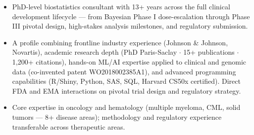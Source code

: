 \vspace*{.2em}
\begin{itemize}
\item[-] PhD-level biostatistics consultant with 13+ years across the full clinical development lifecycle --- from Bayesian Phase I dose-escalation through Phase III pivotal design, high-stakes analysis milestones, and regulatory submission.
\item[-] A profile combining frontline industry experience (Johnson \& Johnson, Novartis), academic research depth (PhD Paris-Saclay $\cdot$ 15+ publications $\cdot$ 1,200+ citations), hands-on ML/AI expertise applied to clinical and genomic data (co-invented patent WO2018002385A1), and advanced programming capabilities (R/Shiny, Python, SAS, SQL, Harvard CS50x certified). Direct FDA and EMA interactions on pivotal trial design and regulatory strategy.
\item[-] Core expertise in oncology and hematology (multiple myeloma, CML, solid tumors --- 8+ disease areas); methodology and regulatory experience transferable across therapeutic areas.
\end{itemize}
